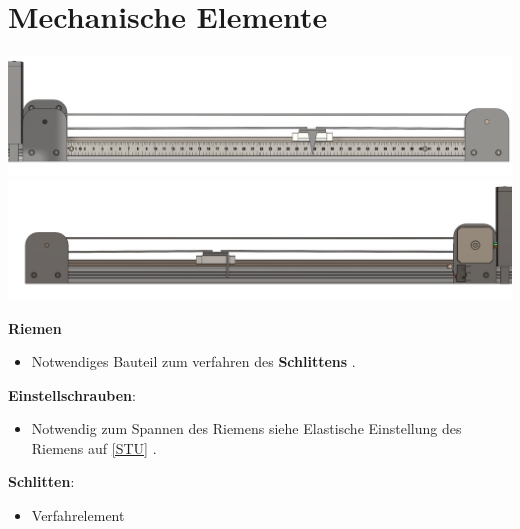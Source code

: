 %
%

\chapter{Mechanische Elemente}
\begin{center}
	
	\includegraphics[width=\textwidth]{Images/Konstruktion4.png}
		\includegraphics[width=\textwidth]{Images/Konstruktion5.png}
\end{center}
	\textbf{Riemen}
\begin{itemize}
	\item Notwendiges Bauteil zum verfahren des \textbf{Schlittens} .
\end{itemize}
\textbf{Einstellschrauben}: 
\begin{itemize}
	\item Notwendig zum Spannen des Riemens siehe \glqq Elastische Einstellung des Riemens \grqq auf \ref{STU} . 
\end{itemize}
\textbf{Schlitten}: 
\begin{itemize}
	\item Verfahrelement  
\end{itemize}



